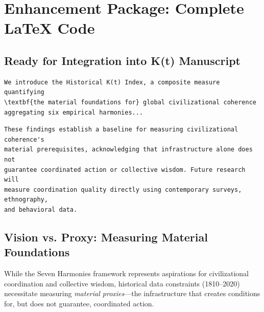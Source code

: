 \documentclass[11pt]{article}
\begin{document}
\section*{Enhancement Package: Complete LaTeX Code}
\subsection*{Ready for Integration into K(t) Manuscript}


\begin{verbatim}
We introduce the Historical K(t) Index, a composite measure quantifying
\textbf{the material foundations for} global civilizational coherence
aggregating six empirical harmonies...
\end{verbatim}


\begin{verbatim}
These findings establish a baseline for measuring civilizational coherence's
material prerequisites, acknowledging that infrastructure alone does not
guarantee coordinated action or collective wisdom. Future research will
measure coordination quality directly using contemporary surveys, ethnography,
and behavioral data.
\end{verbatim}


\subsection{Vision vs. Proxy: Measuring Material Foundations}

While the Seven Harmonies framework represents aspirations for civilizational
coordination and collective wisdom, historical data constraints (1810--2020)
necessitate measuring \textit{material proxies}---the infrastructure that
creates conditions for, but does not guarantee, coordinated action.
\end{document}
